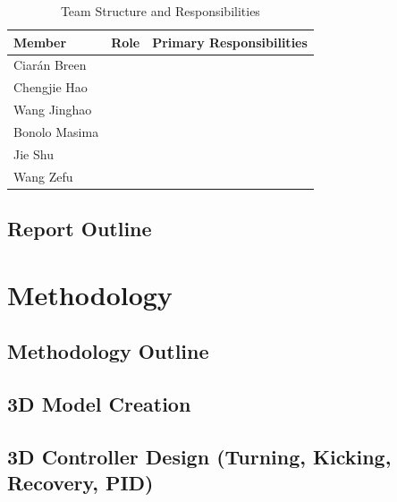 \documentclass[12pt, a4paper]{report}
\newcommand{\memberOne}{Ciarán Breen}     \newcommand{\memberOneID}{ID: 3177181B}
\newcommand{\memberTwo}{Chengjie Hao}     \newcommand{\memberTwoID}{ID: 000000}
\newcommand{\memberThree}{Wang Jinghao}   \newcommand{\memberThreeID}{ID: 000000}
\newcommand{\memberFour}{Bonolo Masima}    \newcommand{\memberFourID}{ID: 3175764M}
\newcommand{\memberFive}{Jie Shu}    \newcommand{\memberFiveID}{ID: 000000}
\newcommand{\memberSix}{Wang Zefu}     \newcommand{\memberSixID}{ID: 000000}
\begin{document}
\begin{table}[H]
  \centering
  \caption{Team Structure and Responsibilities}
  \begin{tabularx}{\textwidth}{lXX}
    \toprule
    \textbf{Member} & \textbf{Role} & \textbf{Primary Responsibilities} \\
    \midrule
    \memberOne   & & \\[4pt]
    \memberTwo   & & \\[4pt]
    \memberThree & & \\[4pt]
    \memberFour  & & \\[4pt]
    \memberFive  & & \\[4pt]
    \memberSix   & & \\
    \bottomrule
  \end{tabularx}
  \label{tab:team-structure}
\end{table}

\section{Report Outline}


\chapter{Methodology}

\section{Methodology Outline}


\section{3D Model Creation}


\section{3D Controller Design (Turning, Kicking, Recovery, PID)}
\end{document}
